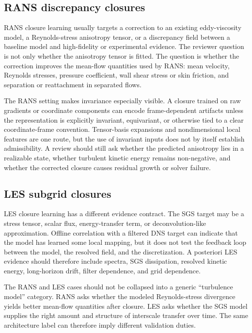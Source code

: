 \documentclass[11pt]{article}
\begin{document}
\subsection{RANS discrepancy closures}

RANS closure learning usually targets a correction to an existing eddy-viscosity model, a Reynolds-stress anisotropy tensor, or a discrepancy field between a baseline model and high-fidelity or experimental evidence. The reviewer question is not only whether the anisotropy tensor is fitted. The question is whether the correction improves the mean-flow quantities used by RANS: mean velocity, Reynolds stresses, pressure coefficient, wall shear stress or skin friction, and separation or reattachment in separated flows.

The RANS setting makes invariance especially visible. A closure trained on raw gradients or coordinate components can encode frame-dependent artifacts unless the representation is explicitly invariant, equivariant, or otherwise tied to a clear coordinate-frame convention. Tensor-basis expansions and nondimensional local features are one route, but the use of invariant inputs does not by itself establish admissibility. A review should still ask whether the predicted anisotropy lies in a realizable state, whether turbulent kinetic energy remains non-negative, and whether the corrected closure causes residual growth or solver failure.

\subsection{LES subgrid closures}

LES closure learning has a different evidence contract. The SGS target may be a stress tensor, scalar flux, energy-transfer term, or deconvolution-like approximation. Offline correlation with a filtered DNS target can indicate that the model has learned some local mapping, but it does not test the feedback loop between the model, the resolved field, and the discretization. A posteriori LES evidence should therefore include spectra, SGS dissipation, resolved kinetic energy, long-horizon drift, filter dependence, and grid dependence.

The RANS and LES cases should not be collapsed into a generic ``turbulence model'' category. RANS asks whether the modeled Reynolds-stress divergence yields better mean-flow quantities after closure. LES asks whether the SGS model supplies the right amount and structure of interscale transfer over time. The same architecture label can therefore imply different validation duties.
\end{document}
